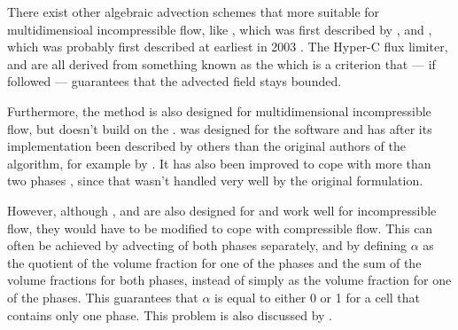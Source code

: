 There exist other algebraic advection schemes that more suitable for multidimensioal incompressible flow, like \CICSAM, which was first described by \citet{Ubbink1999}, and \STACS, which was probably first described at earliest in 2003 \citep{Darwish}. The Hyper-C flux limiter, \CICSAM and \STACS are all derived from something known as the \CBC which is a criterion that --- if followed --- guarantees that the advected field stays bounded.

Furthermore, the \MULES method is also designed for multidimensional incompressible flow, but doesn't build on the \CBC. \MULES was designed for the  software  and has after its implementation been described by others than the original authors of the algorithm, for example by \citet{Berberovi2009}. It has also been improved to cope with more than two phases \citep{Kissling2010}, since that wasn't handled very well by the original formulation.


However, although \CICSAM, \STACS and \MULES are also designed for and work well for incompressible flow, they would have to be modified to cope with compressible flow. This can often be achieved by advecting  of both phases separately, and by defining $\alpha$ as the quotient of the volume fraction for one of the phases and the sum of the volume fractions for both phases, instead of simply as the volume fraction for one of the phases. This guarantees that $\alpha$ is equal to either 0 or 1 for a cell that contains only one phase. This problem is also discussed by \citet{Heyns2011}.





